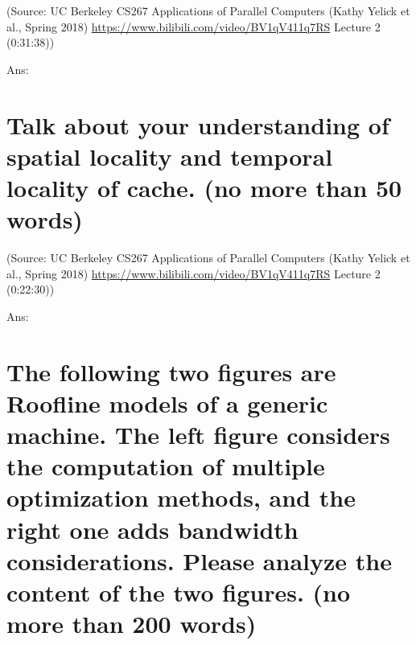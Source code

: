\documentclass[UTF8]{article}
\begin{document}
(Source: UC Berkeley CS267 Applications of Parallel Computers (Kathy Yelick et al., Spring 2018) \url{https://www.bilibili.com/video/BV1qV411q7RS} Lecture 2 (0:31:38))

Ans:%
~\\
\section{Talk about your understanding of spatial locality and temporal locality of cache. (no more than 50 words)}
(Source: UC Berkeley CS267 Applications of Parallel Computers (Kathy Yelick et al., Spring 2018) \url{https://www.bilibili.com/video/BV1qV411q7RS} Lecture 2 (0:22:30))

Ans:%
~\\
\section{The following two figures are Roofline models of a generic machine. The left figure considers the computation of multiple optimization methods, and the right one adds bandwidth considerations. Please analyze the content of the two figures. (no more than 200 words)}

\begin{figure}[htbp]
\centering
{}
\end{figure}
\end{document}
